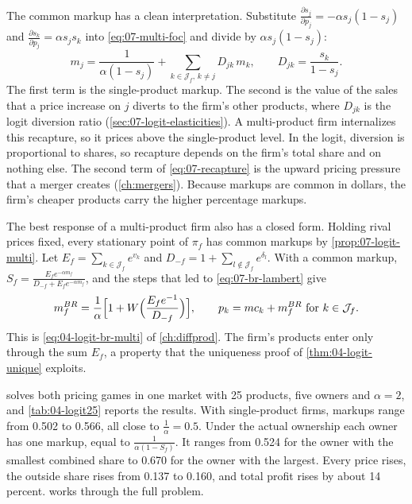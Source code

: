 The common markup has a clean interpretation. Substitute $\frac{\partial s_j}{\partial p_j} = -\alpha s_j(1 - s_j)$
and $\frac{\partial s_k}{\partial p_j} = \alpha s_j s_k$ into \eqref{eq:07-multi-foc} and divide by $\alpha s_j(1 -
s_j)$:
\begin{equation}\label{eq:07-recapture}
  m_j = \frac{1}{\alpha(1 - s_j)} + \sum_{k \in \mathcal{J}_f,\, k \neq j} D_{jk}\, m_k, \qquad D_{jk} = \frac{s_k}{1 -
  s_j}.
\end{equation}
The first term is the single-product markup. The second is the value of the sales that a price increase on $j$
diverts to the firm's other products, where $D_{jk}$ is the logit diversion ratio (\cref{sec:07-logit-elasticities}).
A multi-product firm internalizes this recapture, so it prices above the single-product level. In the logit,
diversion is proportional to shares, so recapture depends on the firm's total share and on nothing else. The second
term of \eqref{eq:07-recapture} is the upward pricing pressure that a merger creates (\cref{ch:mergers}). Because
markups are common in dollars, the firm's cheaper products carry the higher percentage markups.

The best response of a multi-product firm also has a closed form. Holding rival prices fixed, every stationary point
of $\pi_f$ has common markups by \cref{prop:07-logit-multi}. Let $E_f = \sum_{k \in \mathcal{J}_f} e^{v_k}$ and $D_{-f} = 1 +
\sum_{l \notin \mathcal{J}_f} e^{\delta_l}$. With a common markup, $S_f = \frac{E_f e^{-\alpha m_f}}{D_{-f} + E_f
e^{-\alpha m_f}}$, and the steps that led to \eqref{eq:07-br-lambert} give
\begin{equation}\label{eq:07-br-multi}
  m_f^{BR} = \frac{1}{\alpha}\Bigl[1 + W\Bigl(\frac{E_f e^{-1}}{D_{-f}}\Bigr)\Bigr], \qquad
  p_k = mc_k + m_f^{BR} \text{ for } k \in \mathcal{J}_f .
\end{equation}
This is \eqref{eq:04-logit-br-multi} of \cref{ch:diffprod}. The firm's products enter only through the sum $E_f$, a
property that the uniqueness proof of \cref{thm:04-logit-unique} exploits.

 solves both pricing games in one market with 25 products, five owners and $\alpha = 2$, and
\cref{tab:04-logit25} reports the results. With single-product firms, markups range from 0.502 to 0.566, all close to
$\frac{1}{\alpha} = 0.5$. Under the actual ownership each owner has one markup, equal to $\frac{1}{\alpha(1 - S_f)}$.
It ranges from 0.524 for the owner with the smallest combined share to 0.670 for the owner with the largest. Every
price rises, the outside share rises from 0.137 to 0.160, and total profit rises by about 14 percent. 
works through the full problem.

